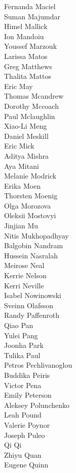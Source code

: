 Fernanda Maciel\\
Suman Majumdar\\
Himel Mallick\\
Ion Mandoiu\\
Youssef Marzouk\\
Larissa Matos\\
Greg Matthews\\
Thalita Mattos\\
Eric May\\
Thomas Mcandrew\\
Dorothy Mccoach\\
Paul Mclaughlin\\
Xiao-Li Meng\\
Daniel Meskill\\
Eric Mick\\
Aditya Mishra\\
Aya Mitani\\
Melanie Modrick\\
Erika Moen\\
Thorsten Moenig\\
Olga Morozova\\
Oleksii Mostovyi\\
Jinjian Mu\\
Nitis Mukhopadhyay\\
Balgobin Nandram\\
Hussein Nasralah\\
Meirose Neal\\
Kerrie Nelson\\
Kerri Neville\\
Isabel Nowinowski\\
Sveinn Olafsson\\
Randy Paffenroth\\
Qiao Pan\\
Yulei Pang\\
Joonha Park\\
Tulika Paul\\
Petros Pechlivanoglou\\
Buddika Peiris\\
Victor Pena\\
Emily Peterson\\
Aleksey Polunchenko\\
Leah Pound\\
Valerie Poynor\\
Joseph Puleo\\
Qi Qi\\
Zhiyu Quan\\
Eugene Quinn\\
